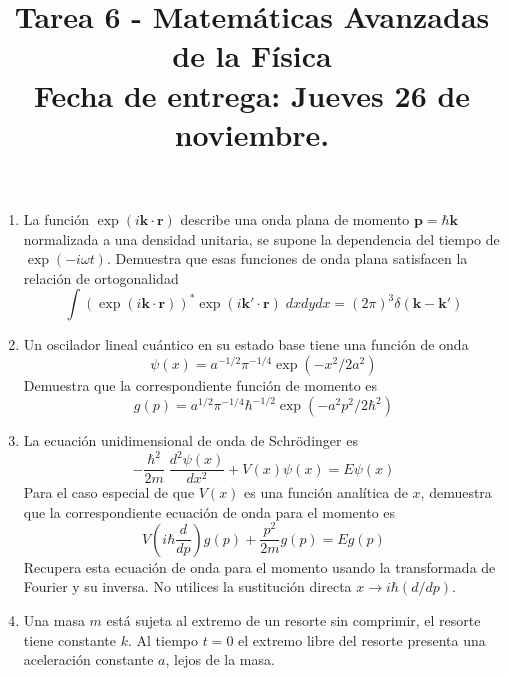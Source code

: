 
\usepackage{standalone}
\usepackage{tikz}   
\usepackage{tikz-3dplot}
\usetikzlibrary{decorations.pathmorphing,patterns}
\usepackage{enumerate}
\usepackage{bigints}
\usepackage{hyperref}
\usepackage{float}
\usepackage[left=1.5cm,top=1.5cm,right=1.5cm,bottom=1.5cm]{geometry}
\title{Tarea 6 - Matemáticas Avanzadas de la Física \\ \Large{\textbf{Fecha de entrega: Jueves 26 de noviembre.}}}
\date{ }

\vspace{-4cm}
\renewcommand\labelenumii{\theenumi.{\arabic{enumii}}}
\maketitle
\fontsize{14}{14}\selectfont
\begin{enumerate}
\item La función $\exp(i\mathbf{k} \cdot \mathbf{r})$ describe una onda plana de momento $\mathbf{p} = \hbar \mathbf{k}$ normalizada a una densidad unitaria, se supone la dependencia del tiempo de $\exp(-i \omega t)$. Demuestra que esas funciones de onda plana satisfacen la relación de ortogonalidad
\[ \int ( \exp(i \mathbf{k} \cdot \mathbf{r} ))^{*}  \exp(i \mathbf{k}' \cdot \mathbf{r}) \; dx dy dx =  (2 \pi)^{3} \delta(\mathbf{k} - \mathbf{k}')  \]
\item Un oscilador lineal cuántico en su estado base tiene una función de onda
\[ \psi(x) = a^{-1/2} \pi^{-1/4} \exp(-x^{2}/2a^{2}) \]
Demuestra que la correspondiente función de momento es
\[ g(p) = a^{1/2} \pi^{-1/4} \hbar^{-1/2} \exp(-a^{2}p^{2}/2\hbar^{2}) \]
\item La ecuación unidimensional de onda de Schrödinger es
\[ - \dfrac{\hbar^{2}}{2m} \; \dfrac{d^{2} \psi(x)}{d x^{2}} +  V(x) \psi(x) = E \psi (x) \]
Para el caso especial de que $V(x)$ es una función analítica de $x$, demuestra que la correspondiente ecuación de onda para el momento es
\[ V \left( i \hbar \dfrac{d}{dp} \right) g(p) + \dfrac{p^{2}}{2m} g(p) =  E g(p)  \]
Recupera esta ecuación de onda para el momento usando la transformada de Fourier y su inversa. No utilices la sustitución directa $x \to i \hbar (d/dp)$.
\item Una masa $m$ está sujeta al extremo de un resorte sin comprimir, el resorte tiene constante $k$. Al tiempo $t=0$ el extremo libre del resorte presenta una aceleración constante $a$, lejos de la masa. 
\begin{figure}[H]
\centering

\end{figure}
\end{enumerate}
